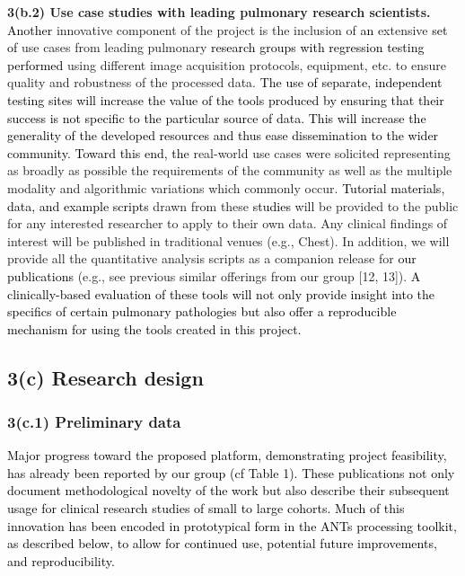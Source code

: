 \documentclass[11pt,]{article}
\begin{document}
\textbf{3(b.2) Use case studies with leading pulmonary research
scientists.} \textcolor{black}{Another} innovative component of the
project is the inclusion of \textcolor{black}{an} extensive
\textcolor{black}{set of} use cases from leading pulmonary
\textcolor{black}{research groups with regression testing performed}
using different image acquisition protocols, equipment, etc. to ensure
quality and robustness of the processed data.
\textcolor{black}{The use of separate, independent testing sites will increase the value of the
tools produced by ensuring that their success is not specific to the particular
source of data.  This will increase the generality of the developed resources and
thus ease dissemination to the wider community. Toward this end, the}
real-world use cases were solicited representing as broadly as possible
the requirements of the community as well as the multiple modality and
algorithmic variations which commonly occur.
\textcolor{black}{Tutorial materials, data, and example scripts} drawn
from these \textcolor{black}{studies} will be provided to the public for
any interested researcher to apply to their own data. Any clinical
findings of interest will be published in traditional venues (e.g.,
Chest). In addition, we will provide all the quantitative analysis
scripts as a companion release for \textcolor{black}{our publications}
(e.g., see previous similar offerings from our group {[}12, 13{]}).
\textcolor{black}{A clinically-based evaluation of these tools will not only provide insight into the specifics
of certain pulmonary pathologies
but also offer a reproducible mechanism for using the tools created in this project.}

\subsection{\texorpdfstring{\textbf{3(c) Research
design}}{3(c) Research design}}\label{c-research-design}

\subsubsection{3(c.1) Preliminary data}\label{c.1-preliminary-data}

\textcolor{black}{Major progress toward the proposed platform, demonstrating
project feasibility, has already been reported by our group (cf Table 1).
These publications not only document methodological novelty of the work but
also describe their subsequent usage for clinical research studies of small
to large cohorts.  Much of this innovation has been encoded in prototypical
form in the ANTs processing toolkit, as described below, to allow for continued
use, potential future improvements, and reproducibility.}
\end{document}

